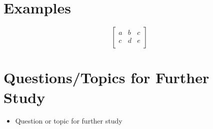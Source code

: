 \documentclass[12pt,a4paper]{article}
\begin{document}
\section{Examples}
  \[
    \begin{bmatrix}
      a & b & c \\ 
      c  & d & e \\
    \end{bmatrix}
  \]
\section{Questions/Topics for Further Study}
\begin{itemize}
  \item Question or topic for further study
\end{itemize}
\end{document}
